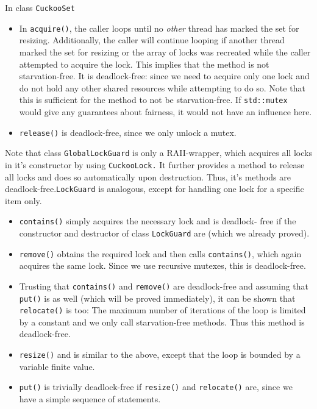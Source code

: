 \documentclass[a4paper,10pt]{article}
\begin{document}
In class \lstinline|CuckooSet|
\begin{itemize}
\item In \lstinline|acquire()|, the caller loops until no \textit{other} thread has marked the set for resizing. Additionally, the caller will continue looping if another thread marked the set for resizing or the array of locks was recreated while the caller attempted to acquire the lock. This implies that the method is not starvation-free. It is deadlock-free: since we need to acquire only one lock and do not hold any other shared resources while attempting to do so. Note that this is sufficient for the method to not be starvation-free. If \lstinline|std::mutex| would  give any guarantees about fairness, it would not have an influence here. 
\item \lstinline|release()| is deadlock-free, since we only unlock a mutex.
\end{itemize}
Note that class \lstinline|GlobalLockGuard| is only a RAII-wrapper, which acquires all locks in it's constructor by using \lstinline|CuckooLock.| It further provides a method to release all locks and does so automatically upon destruction. Thus, it's methods are deadlock-free.\lstinline|LockGuard| is analogous, except for handling one lock for a specific item only. 

\begin{itemize}
\item \lstinline|contains()| simply acquires the necessary lock and is deadlock- free if the constructor and destructor of class \lstinline|LockGuard| are (which we already proved).
\item \lstinline|remove()| obtains the required lock and then calls \lstinline|contains()|, which again acquires the same lock. Since we use recursive mutexes, this is deadlock-free. 
\item Trusting that \lstinline|contains()| and \lstinline|remove()| are deadlock-free and assuming that \lstinline|put()| is as well (which will be proved immediately), it can be shown that \lstinline|relocate()| is too: The maximum number of iterations of the loop is limited by a constant and we only call starvation-free methods. Thus this method is deadlock-free.
\item \lstinline|resize()| and is similar to the above, except that the loop is bounded by a variable finite value.
\item \lstinline|put()| is trivially deadlock-free if \lstinline|resize()| and \lstinline|relocate()| are, since we have a simple sequence of statements. 
\end{itemize}
\end{document}
